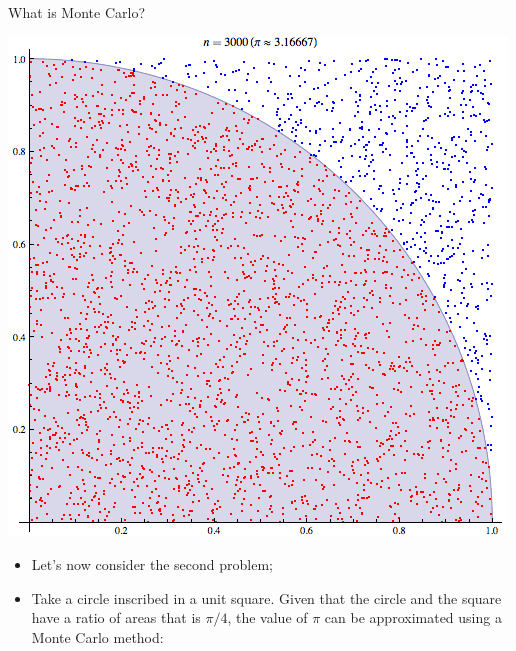 \documentclass[11pt]{beamer}
\begin{document}
\begin{frame}{What is Monte Carlo?}
\noindent\begin{minipage}{0.5\textwidth}%
\includegraphics[width=\linewidth]{img/pi_greco_1.png}
\end{minipage}%
\hfill%
\begin{minipage}{0.5\textwidth}
\begin{itemize}
\item Let's now consider the second problem;
\item Take a circle inscribed in a unit square. Given that the circle and the square have a ratio of areas that is $\pi/4$, the value of $\pi$ can be approximated using a Monte Carlo method:
\end{itemize}
\end{minipage}
\end{frame}
\end{document}
